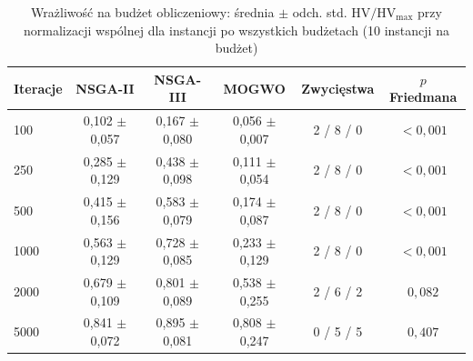 \begin{table}[htbp]
    \centering
    \caption{Wrażliwość na budżet obliczeniowy: średnia $\pm$ odch. std. $\mathrm{HV}/\mathrm{HV}_{\max}$ przy normalizacji wspólnej dla instancji po wszystkich budżetach (10 instancji na budżet)}
    \label{tab:budget}
    \begin{tabular}{l c c c c c}
        \hline
        Iteracje & NSGA-II & NSGA-III & MOGWO & Zwycięstwa & $p$ Friedmana \\
        \hline
        100 & 0{,}102 $\pm$ 0{,}057 & 0{,}167 $\pm$ 0{,}080 & 0{,}056 $\pm$ 0{,}007 & 2 / 8 / 0 & $< 0{,}001$ \\
        250 & 0{,}285 $\pm$ 0{,}129 & 0{,}438 $\pm$ 0{,}098 & 0{,}111 $\pm$ 0{,}054 & 2 / 8 / 0 & $< 0{,}001$ \\
        500 & 0{,}415 $\pm$ 0{,}156 & 0{,}583 $\pm$ 0{,}079 & 0{,}174 $\pm$ 0{,}087 & 2 / 8 / 0 & $< 0{,}001$ \\
        1000 & 0{,}563 $\pm$ 0{,}129 & 0{,}728 $\pm$ 0{,}085 & 0{,}233 $\pm$ 0{,}129 & 2 / 8 / 0 & $< 0{,}001$ \\
        2000 & 0{,}679 $\pm$ 0{,}109 & 0{,}801 $\pm$ 0{,}089 & 0{,}538 $\pm$ 0{,}255 & 2 / 6 / 2 & $0{,}082$ \\
        5000 & 0{,}841 $\pm$ 0{,}072 & 0{,}895 $\pm$ 0{,}081 & 0{,}808 $\pm$ 0{,}247 & 0 / 5 / 5 & $0{,}407$ \\
        \hline
    \end{tabular}
\end{table}
